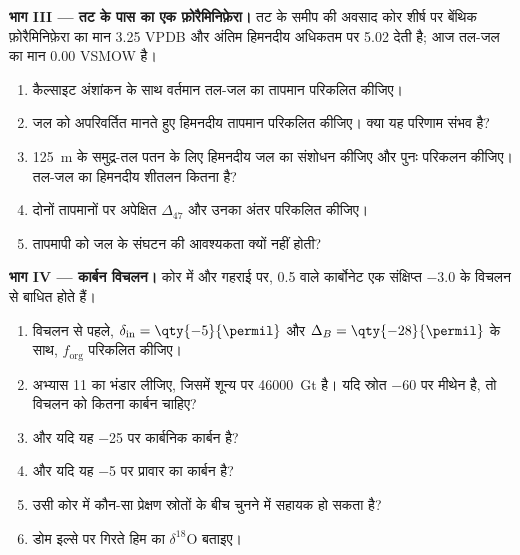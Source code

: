 \begin{problem}
\medskip\noindent\textbf{भाग III --- तट के पास का एक फ़ोरैमिनिफ़ेरा।}
तट के समीप की अवसाद कोर शीर्ष पर बेंथिक फ़ोरैमिनिफ़ेरा का
मान \qty{3.25}{\permil} VPDB और अंतिम हिमनदीय अधिकतम पर \qty{5.02}{\permil} देती है;
आज तल-जल का मान \qty{0.00}{\permil} VSMOW है।
\begin{enumerate}[resume]
\item कैल्साइट अंशांकन के साथ वर्तमान तल-जल का तापमान
परिकलित कीजिए।
\item जल को अपरिवर्तित मानते हुए हिमनदीय तापमान परिकलित कीजिए। क्या
यह परिणाम संभव है?
\item \qty{125}{m} के समुद्र-तल पतन के लिए हिमनदीय जल का संशोधन कीजिए
और पुनः परिकलन कीजिए। तल-जल का हिमनदीय शीतलन कितना है?
\item दोनों तापमानों पर अपेक्षित $\Delta_{47}$ और उनका
अंतर परिकलित कीजिए।
\item {} तापमापी को जल के संघटन की आवश्यकता
क्यों नहीं होती?
\end{enumerate}

\medskip\noindent\textbf{भाग IV --- कार्बन विचलन।} कोर में और गहराई पर,
\qty{+0.5}{\permil} वाले कार्बोनेट एक संक्षिप्त
\qty{-3.0}{\permil} के विचलन से बाधित होते हैं।
\begin{enumerate}[resume]
\item विचलन से पहले, $\delta_{\mathrm{in}} = \qty{-5}{\permil}$ और
$\Delta_B = \qty{-28}{\permil}$ के साथ, $f_{\mathrm{org}}$ परिकलित कीजिए।
\item अभ्यास 11 का भंडार लीजिए, जिसमें शून्य पर \qty{46000}{Gt} है। यदि स्रोत
\qty{-60}{\permil} पर मीथेन है, तो विचलन को कितना कार्बन चाहिए?
\item और यदि यह \qty{-25}{\permil} पर कार्बनिक कार्बन है?
\item और यदि यह \qty{-5}{\permil} पर प्रावार का कार्बन है?
\item उसी कोर में कौन-सा प्रेक्षण स्रोतों के बीच
चुनने में सहायक हो सकता है?
\item डोम इल्से पर गिरते हिम का $\delta^{18}\mathrm O$ बताइए।
\end{enumerate}
\end{problem}
